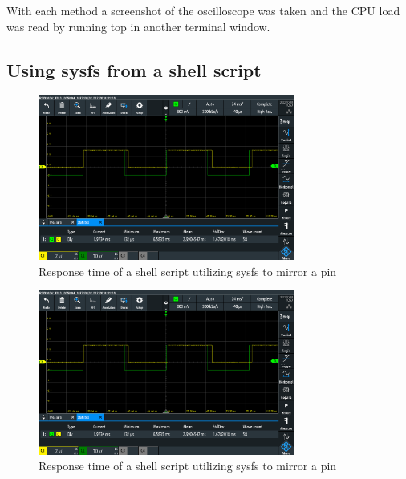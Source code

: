 \documentclass{article}
\begin{document}
With each method a screenshot of the oscilloscope was taken and the CPU load was read by running top in another terminal window.

\subsection{Using sysfs from a shell script}

\begin{figure}[H]
    \centering
    \includegraphics[width=0.75\textwidth]{Project4KernelSpaceEncoderDriver/part2_shell_mirror.PNG}
    \caption{Response time of a shell script utilizing sysfs to mirror a pin}
    \label{fig:shell}
\end{figure}

\begin{figure}[H]
    \centering
    \includegraphics[width=0.75\textwidth]{Project4KernelSpaceEncoderDriver/part2_shell_mirror.PNG}
    \caption{Response time of a shell script utilizing sysfs to mirror a pin}
    \label{fig:shell}
\end{figure}
\end{document}
